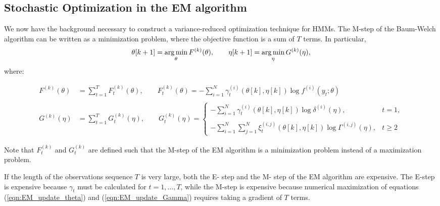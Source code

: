 \subsection{Stochastic Optimization in the EM algorithm}

We now have the background necessary to construct a variance-reduced optimization technique for HMMs. The M-step of the Baum-Welch algorithm can be written as a minimization problem, where the objective function is a sum of $T$ terms. In particular, $$\theta[k+1] = \operatorname*{arg\,min}_{\theta} F^{(k)}(\theta), \qquad \eta[k+1] = \operatorname*{arg\,min}_{\eta} G^{(k)}(\eta),$$ where:

\begin{align}
    F^{(k)}(\theta) &= \sum_{t=1}^T F_t^{(k)}(\theta), \qquad F_t^{(k)}(\theta) = - \sum_{i=1}^N \gamma^{(i)}_t(\theta[k], \eta[k]) \log f^{(i)}(y_t;\theta) \label{eqn:F} \\ \nonumber \\
    G^{(k)}(\eta) &= \sum_{t=1}^{T} G_t^{(k)}(\eta), 
    \qquad G_t^{(k)}(\eta) = 
    \begin{cases}
        - \sum_{i=1}^N \gamma^{(i)}_t(\theta[k],\eta[k]) \log \delta^{(i)}(\eta), & t = 1, \\\\
        - \sum_{i=1}^N \sum_{j=1}^N \xi^{(i,j)}_t(\theta[k], \eta[k]) \log \Gamma^{(i,j)}(\eta), & t \geq 2
    \end{cases}
    \label{eqn:G}
\end{align}


Note that $F_t^{(k)}$ and $G_t^{(k)}$ are defined such that the M-step of the EM algorithm is a minimization problem instead of a maximization problem. 

If the length of the observations sequence $T$ is very large, %
both the E- step and the M- step of the EM algorithm are expensive. The E-step is expensive because $\gamma_t$ must be calculated for $t = 1,\ldots,T$, while the M-step is expensive because numerical maximization of equations (\ref{eqn:EM_update_theta}) and (\ref{eqn:EM_update_Gamma}) requires taking a gradient of $T$ terms.

